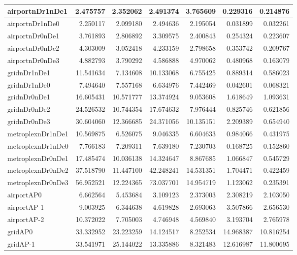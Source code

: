 \begin{longtable}{|l|r|r|r|r|r|r|}
\endlastfoot
airportnDr1nDe1 & 2.475757 & 2.352062 & 2.491374 & 3.765609 & 0.229316 & 0.214876 \\ \hline
airportnDr1nDe0 & 2.250117 & 2.099180 & 2.494636 & 2.195054 & 0.031899 & 0.032261 \\ \hline
airportnDr0nDe1 & 3.761893 & 2.806892 & 3.309575 & 2.400843 & 0.254324 & 0.223607 \\ \hline
airportnDr0nDe2 & 4.303009 & 3.052418 & 4.233159 & 2.798658 & 0.353742 & 0.209767 \\ \hline
airportnDr0nDe3 & 4.882793 & 3.790292 & 4.586888 & 4.970062 & 0.480968 & 0.163079 \\ \hline
gridnDr1nDe1 & 11.541634 & 7.134608 & 10.133068 & 6.755425 & 0.889314 & 0.586023 \\ \hline
gridnDr1nDe0 & 7.494640 & 7.557168 & 6.634976 & 7.442469 & 0.042601 & 0.068321 \\ \hline
gridnDr0nDe1 & 16.605431 & 10.571777 & 13.374924 & 9.053608 & 1.618649 & 1.093631 \\ \hline
gridnDr0nDe2 & 24.526532 & 10.744354 & 17.674632 & 7.976444 & 0.825746 & 0.621856 \\ \hline
gridnDr0nDe3 & 30.604060 & 12.366685 & 24.371056 & 10.135151 & 2.209389 & 0.654940 \\ \hline
metroplexnDr1nDe1 & 10.569875 & 6.526075 & 9.046335 & 6.604633 & 0.984066 & 0.431975 \\ \hline
metroplexnDr1nDe0 & 7.766183 & 7.209311 & 7.639180 & 7.230703 & 0.168725 & 0.152860 \\ \hline
metroplexnDr0nDe1 & 17.485474 & 10.036138 & 14.324647 & 8.867685 & 1.066847 & 0.545729 \\ \hline
metroplexnDr0nDe2 & 37.518790 & 11.447100 & 42.248241 & 14.531351 & 1.704471 & 0.422459 \\ \hline
metroplexnDr0nDe3 & 56.952521 & 12.224365 & 73.037701 & 14.954719 & 1.123062 & 0.235391 \\ \hline
airportAP0 & 6.662564 & 5.453684 & 3.109123 & 2.373003 & 2.308219 & 2.103050 \\ \hline
airportAP-1 & 9.003925 & 6.344638 & 4.619828 & 2.693063 & 3.507866 & 2.656530 \\ \hline
airportAP-2 & 10.372022 & 7.705003 & 4.746948 & 4.569840 & 3.193704 & 2.765978 \\ \hline
gridAP0 & 33.332952 & 23.223259 & 14.124517 & 8.252534 & 14.968387 & 10.816254 \\ \hline
gridAP-1 & 33.541971 & 25.144022 & 13.335886 & 8.321483 & 12.616987 & 11.800695 \\ \hline

\end{longtable}
